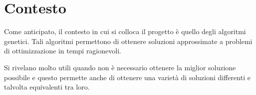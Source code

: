\chapter{Contesto}

Come anticipato, il contesto in cui si colloca il progetto è quello degli
algoritmi genetici. Tali algoritmi permettono di ottenere soluzioni approssimate
a problemi di ottimizzazione in tempi ragionevoli.

Si rivelano molto utili
quando non è necessario ottenere la miglior soluzione possibile e questo
permette anche di ottenere una varietà di soluzioni differenti e talvolta
equivalenti tra loro.
